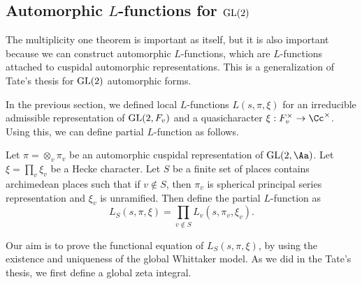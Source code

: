 \subsection{Automorphic $L$-functions for $\mathrm{GL}(2)$}

The multiplicity one theorem is important as itself, but it is also important because we can construct automorphic $L$-functions, which are $L$-functions attached to cuspidal automorphic representations. 
This is a generalization of Tate's thesis for  $\mathrm{GL}(2)$ automorphic forms. 

In the previous section, we defined local $L$-functions $L(s, \pi, \xi)$ for an irreducible admissible representation of $\mathrm{GL}(2, F_v)$ and a quasicharacter $\xi:F_v^{\times} \to \Cc^{\times}$. 
Using this, we can define partial $L$-function as follows. 

\begin{comment}
First, we define local $L$-functions for spherical principal series representations. Recall that if $\pi = \otimes_{v} \pi_{v}$ is a cuspidal automorphic representation of $\GL(2)$, then $\pi_{v}$ is spherical for all but finitely many $v$, so is spherical principal series representation since 1-dimensional spherical representations can't admit Whittaker models. 

\begin{definition}[Local $L$-function]
Let $F$ be a non-archimedean local field with a ring of integer $\calO = \calO_{F}$ and a uniformizer $\varpi$. Let $q$ be the cardinality of the residue field $\calO/(\varpi)$ and let $\xi$ be a unramified character of $F^{\times}$. Let $\pi = \pi(\chi_{1}, \chi_{2})$ be a spherical principal series representation of $\GL(2, F)$ associated to unramified characters $\chi_{1}, \chi_{2}$.  
Define the local $L$-function as
$$
L(s, \pi, \xi) = (1-\alpha_{1}\xi(\varpi)q^{-s})^{-1}(1-\alpha_{2}\xi(\varpi)q^{-s})^{-1}
$$
where $\alpha_{i} = \chi_{i}(\varpi)$. 
\end{definition}
By multiply those local $L$-functions, we can define (incomplete) global $L$-function. 
\end{comment}

\begin{definition}
Let $\pi = \otimes_{v} \pi_{v}$ be an automorphic cuspidal representation of $\GL(2, \Aa)$. 
Let $\xi = \prod_{v}\xi_{v}$ be a Hecke character. 
Let $S$ be a finite set of places contains archimedean places such that if $v\not\in S$, then $\pi_{v}$ is spherical principal series representation and $\xi_{v}$ is unramified. 
Then define the partial $L$-function as
$$
L_{S}(s, \pi, \xi) = \prod_{v\not\in S} L_{v}(s, \pi_{v}, \xi_{v}). 
$$
\end{definition}
Our aim is to prove the functional equation of $L_{S}(s, \pi, \xi)$, by using the existence and uniqueness of the global Whittaker model.  
As we did in the Tate's thesis, we first define a global zeta integral. 

